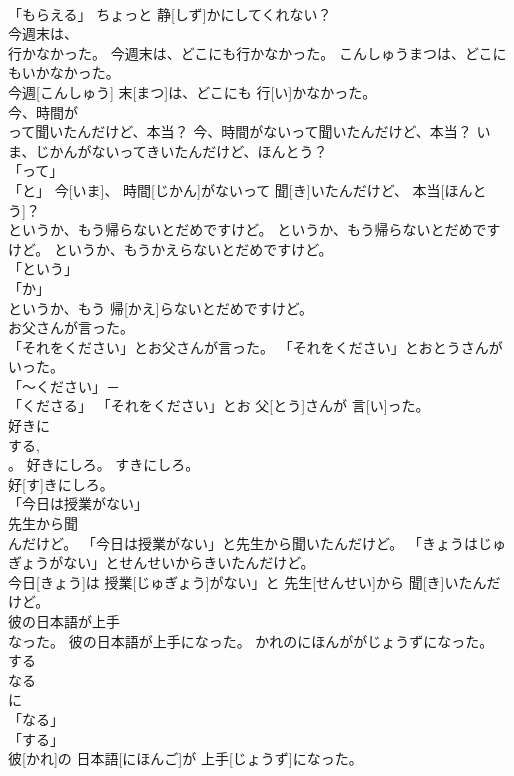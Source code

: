 \documentclass[8pt]{extreport}
\begin{document}
\begin{CJK}{UTF8}{min}
\\	「もらえる」	ちょっと 静[しず]かにしてくれない？		
\\	今週末は、
\\	行かなかった。	今週末は、どこにも行かなかった。	こんしゅうまつは、どこにもいかなかった。	
\\	今週[こんしゅう] 末[まつ]は、どこにも 行[い]かなかった。		
\\	今、時間が
\\	って聞いたんだけど、本当？	今、時間がないって聞いたんだけど、本当？	いま、じかんがないってきいたんだけど、ほんとう？	
\\	「って」 
\\	「と」	今[いま]、 時間[じかん]がないって 聞[き]いたんだけど、 本当[ほんとう]？		
\\	というか、もう帰らないとだめですけど。	というか、もう帰らないとだめですけど。	というか、もうかえらないとだめですけど。	
\\	「という」 
\\	「か」 
\\	というか、もう 帰[かえ]らないとだめですけど。		
\\	お父さんが言った。
\\	「それをください」とお父さんが言った。	「それをください」とおとうさんがいった。	
\\	「～ください」－ 
\\	「くださる」	「それをください」とお 父[とう]さんが 言[い]った。		
\\	好きに
\\	する, 
\\	。	好きにしろ。	すきにしろ。	
\\	好[す]きにしろ。		
\\	「今日は授業がない」
\\	先生から聞
\\	んだけど。	「今日は授業がない」と先生から聞いたんだけど。	「きょうはじゅぎょうがない」とせんせいからきいたんだけど。	
\\	今日[きょう]は 授業[じゅぎょう]がない」と 先生[せんせい]から 聞[き]いたんだけど。		
\\	彼の日本語が上手
\\	なった。	彼の日本語が上手になった。	かれのにほんががじょうずになった。	
\\	する 
\\	なる 
\\	に 
\\	「なる」 
\\	「する」 
\\	彼[かれ]の 日本語[にほんご]が 上手[じょうず]になった。		

\end{CJK}
\end{document}
